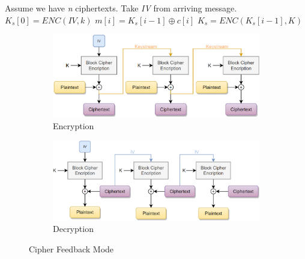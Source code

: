 \begin{definition}
\begin{algorithmic}[1]
\State Assume we have \textit{n} ciphertexts.
\State Take \textit{IV} from arriving message.
\State $K_s[0] = ENC(IV, k)$
\State $m[i] = K_s[i-1]\oplus{c[i]}$
\State $K_s = ENC(K_s[i-1], K)$
\EndFor
\end{algorithmic}
\end{definition}
\begin{figure}[h]
    \centering
    \begin{subfigure}[b]{0.48\textwidth}
    \includegraphics[width=\textwidth]{image/cfbenc.png}
    \caption{Encryption}
    \label{fig:cfbenc}
    \end{subfigure}\quad
    \begin{subfigure}[b]{0.48\textwidth}
    \includegraphics[width=\textwidth]{image/cfbdec.png}
    \caption{Decryption}
    \label{fig:cfbdec}
    \end{subfigure}
    \caption{Cipher Feedback Mode}
\end{figure}
